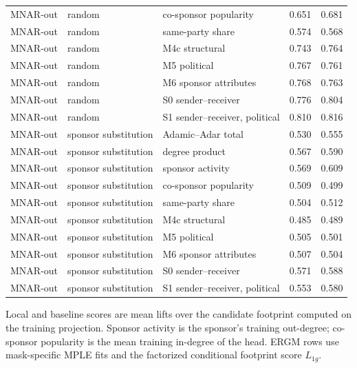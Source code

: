 \begin{table}[tbp]
\begin{tabular}{lllrr}
MNAR-out & random & co-sponsor popularity & 0.651 & 0.681 \\
MNAR-out & random & same-party share & 0.574 & 0.568 \\
MNAR-out & random & M4c structural & 0.743 & 0.764 \\
MNAR-out & random & M5 political & 0.767 & 0.761 \\
MNAR-out & random & M6 sponsor attributes & 0.768 & 0.763 \\
MNAR-out & random & S0 sender--receiver & 0.776 & 0.804 \\
MNAR-out & random & S1 sender--receiver, political & 0.810 & 0.816 \\
MNAR-out & sponsor substitution & Adamic--Adar total & 0.530 & 0.555 \\
MNAR-out & sponsor substitution & degree product & 0.567 & 0.590 \\
MNAR-out & sponsor substitution & sponsor activity & 0.569 & 0.609 \\
MNAR-out & sponsor substitution & co-sponsor popularity & 0.509 & 0.499 \\
MNAR-out & sponsor substitution & same-party share & 0.504 & 0.512 \\
MNAR-out & sponsor substitution & M4c structural & 0.485 & 0.489 \\
MNAR-out & sponsor substitution & M5 political & 0.505 & 0.501 \\
MNAR-out & sponsor substitution & M6 sponsor attributes & 0.507 & 0.504 \\
MNAR-out & sponsor substitution & S0 sender--receiver & 0.571 & 0.588 \\
MNAR-out & sponsor substitution & S1 sender--receiver, political & 0.553 & 0.580 \\
\bottomrule
\end{tabular}
\par\vspace{2pt}\footnotesize Local and baseline scores are mean lifts over the candidate footprint computed on the training projection. Sponsor activity is the sponsor's training out-degree; co-sponsor popularity is the mean training in-degree of the head. ERGM rows use mask-specific MPLE fits and the factorized conditional footprint score $L_{1g}$.
\end{table}